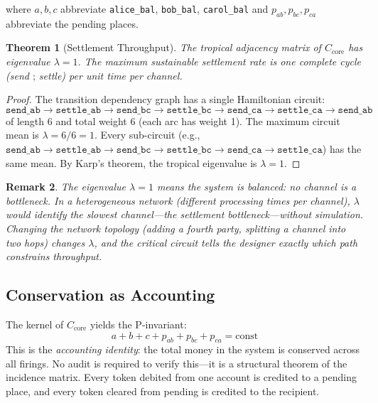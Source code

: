 \documentclass[11pt,a4paper]{article}
\newtheorem{theorem}{Theorem}
\newtheorem{remark}[theorem]{Remark}
\begin{document}
where $a, b, c$ abbreviate \texttt{alice\_bal}, \texttt{bob\_bal}, \texttt{carol\_bal} and $p_{ab}, p_{bc}, p_{ca}$ abbreviate the pending places.

\begin{theorem}[Settlement Throughput]
\label{thm:settle-throughput}
The tropical adjacency matrix of $C_{\mathrm{core}}$ has eigenvalue $\lambda = 1$.
The maximum sustainable settlement rate is one complete cycle (send $\mathbin{;}$ settle) per unit time per channel.
\end{theorem}

\begin{proof}
The transition dependency graph has a single Hamiltonian circuit:
\[
  \mathtt{send\_ab} \to \mathtt{settle\_ab} \to \mathtt{send\_bc} \to \mathtt{settle\_bc} \to \mathtt{send\_ca} \to \mathtt{settle\_ca} \to \mathtt{send\_ab}
\]
of length 6 and total weight 6 (each arc has weight 1).
The maximum circuit mean is $\lambda = 6/6 = 1$.
Every sub-circuit (e.g., $\mathtt{send\_ab} \to \mathtt{settle\_ab} \to \mathtt{send\_bc} \to \mathtt{settle\_bc} \to \mathtt{send\_ca} \to \mathtt{settle\_ca}$) has the same mean.
By Karp's theorem, the tropical eigenvalue is $\lambda = 1$.
\end{proof}

\begin{remark}
The eigenvalue $\lambda = 1$ means the system is \emph{balanced}: no channel is a bottleneck.
In a heterogeneous network (different processing times per channel), $\lambda$ would identify the slowest channel---the settlement bottleneck---without simulation.
Changing the network topology (adding a fourth party, splitting a channel into two hops) changes $\lambda$, and the critical circuit tells the designer exactly which path constrains throughput.
\end{remark}

\subsection{Conservation as Accounting}

The kernel of $C_{\mathrm{core}}$ yields the P-invariant:
\[
  a + b + c + p_{ab} + p_{bc} + p_{ca} = \text{const}
\]
This is the \emph{accounting identity}: the total money in the system is conserved across all firings.
No audit is required to verify this---it is a structural theorem of the incidence matrix.
Every token debited from one account is credited to a pending place, and every token cleared from pending is credited to the recipient.
\end{document}
